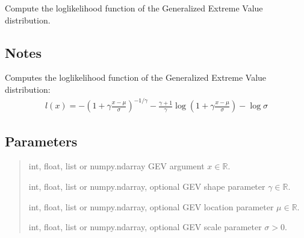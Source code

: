 \documentclass[a4paper,11pt,openany,english]{sphinxmanual}
\begin{document}

\begin{fulllineitems}
\label{\detokenize{api_misc:xtremes.miscellaneous.GEV_ll}}
\pysigstartsignatures
{}
\pysigstopsignatures
\sphinxAtStartPar
Compute the log\sphinxhyphen{}likelihood function of the Generalized Extreme Value distribution.


\subsection{Notes}
\label{\detokenize{api_misc:id17}}
\sphinxAtStartPar
Computes the log\sphinxhyphen{}likelihood function of the Generalized Extreme Value distribution:
\begin{equation*}
\begin{split}l(x) = -\left(1+\gamma \frac{x-\mu}{\sigma}\right)^{-1/\gamma}
       -\frac{\gamma+1}{\gamma}\log\left(1+\gamma \frac{x-\mu}{\sigma}\right)
       -\log\sigma\end{split}
\end{equation*}

\subsection{Parameters}
\label{\detokenize{api_misc:id18}}\begin{quote}\begin{description}
\sphinxAtStartPar
int, float, list or numpy.ndarray
GEV argument \(x\in \mathbb{R}\).

\sphinxAtStartPar
int, float, list or numpy.ndarray, optional
GEV shape parameter \(\gamma\in \mathbb{R}\).

\sphinxAtStartPar
int, float, list or numpy.ndarray, optional
GEV location parameter \(\mu\in \mathbb{R}\).

\sphinxAtStartPar
int, float, list or numpy.ndarray, optional
GEV scale parameter \(\sigma>0\).


\end{description}
\end{quote}
\end{fulllineitems}
\end{document}
